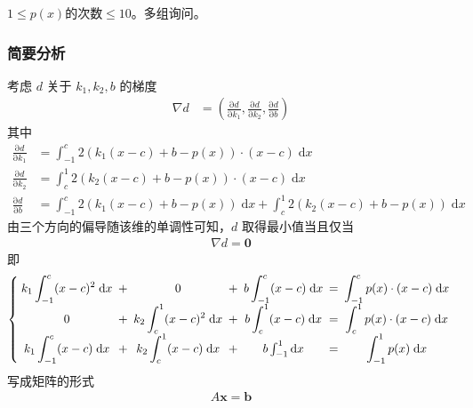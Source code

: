 \documentclass{ctexartutf8}
\numberwithin{theorem}{section}
\numberwithin{theorem}{subsection}
\begin{document}
			$1 \le p(x) \text{的次数} \le 10$。多组询问。
			
		\subsubsection{简要分析}
			考虑 $d$ 关于 $k_1,k_2,b$ 的梯度
			\begin{align}
				\nabla d & = \left(\frac{\mathrm{\partial} d}{\mathrm{\partial} k_1},
						\frac{\mathrm{\partial} d}{\mathrm{\partial} k_2},
						\frac{\mathrm{\partial} d}{\mathrm{\partial} b}\right) 
			\end{align}
			其中
			\begin{align}
					\frac{\mathrm{\partial} d}{\mathrm{\partial} k_1} 
						& = \int_{-1}^{c} 2(k_1(x-c)+b-p(x)) \cdot (x-c) \; \mathrm{d}x\\
					\frac{\mathrm{\partial} d}{\mathrm{\partial} k_2} 
						& = \int_{c}^{1} 2(k_2(x-c)+b-p(x)) \cdot (x-c) \; \mathrm{d}x\\
					\frac{\mathrm{\partial} d}{\mathrm{\partial} b} 
						& = \int_{-1}^{c} 2(k_1(x-c)+b-p(x)) \; \mathrm{d}x +
							\int_{c}^{1} 2(k_2(x-c)+b-p(x)) \; \mathrm{d}x 
			\end{align}
			由三个方向的偏导随该维的单调性可知，$d$ 取得最小值当且仅当
			\begin{align}
				\nabla d = \mathbf{0}
			\end{align}
			即
			\begin{align}
				\left\{\setlength{\tabcolsep}{2.5pt}
					\begin{tabular}{cccccccc}
						$\displaystyle k_1 \int_{-1}^{c} (x-c)^2 \; \mathrm{d}x$ & $+$ & $0$ & $+$ & $\displaystyle b \int_{-1}^{c} (x-c) \; \mathrm{d}x $  &$ =$&$\displaystyle  \int_{-1}^{c} p(x)\cdot(x-c) \; \mathrm{d}x$ \\
						$0$ & $+$ & $\displaystyle k_2 \int_{c}^{1} (x-c)^2 \; \mathrm{d}x$ &$ +$&$ \displaystyle b \int_{c}^{1} (x-c) \; \mathrm{d}x $&$  =$ &$ \displaystyle \int_{c}^{1} p(x)\cdot(x-c) \; \mathrm{d}x$ \\
						$k_1 \displaystyle \int_{-1}^{c} (x-c) \; \mathrm{d}x$ & $+$ & $k_2\displaystyle \int_{c}^{1} (x-c) \; \mathrm{d}x$ &$ +$&$ b \int_{-1}^{1} \mathrm{d}x $&$  =$ &$ \displaystyle \int_{-1}^{1} p(x) \; \mathrm{d}x$ 
					\end{tabular}
				\right.
			\end{align}
			写成矩阵的形式
			\begin{align}
				A\mathbf{x} = \mathbf{b}
			\end{align}
\end{document}

